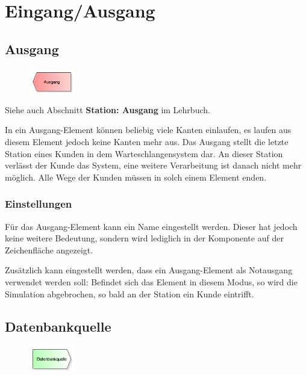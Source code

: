 \chapter{Eingang/Ausgang}

\renewcommand{\thepage}{\arabic{page}}
\setcounter{page}{1}

\section{Ausgang}
\label{ref:ModelElementDispose}

\begin{figure}
\vspace{-22pt}
\includegraphics[width=2cm]{imageModelElementDispose.png}
\vspace{-22pt}
\end{figure}

Siehe auch Abschnitt \textbf{Station: Ausgang} im Lehrbuch.

In ein Ausgang-Element können beliebig viele Kanten einlaufen, es laufen aus diesem Element jedoch keine Kanten mehr aus.
Das Ausgang stellt die letzte Station eines Kunden in dem Warteschlangensystem dar. An dieser Station verlässt der Kunde
das System, eine weitere Verarbeitung ist danach nicht mehr möglich. Alle Wege der Kunden müssen in solch einem Element enden.

\subsection*{Einstellungen}

Für das Ausgang-Element kann ein Name eingestellt werden. Dieser hat jedoch keine weitere Bedeutung, sondern wird lediglich
in der Komponente auf der Zeichenfläche angezeigt.

Zusätzlich kann eingestellt werden, dass ein Ausgang-Element als Notausgang verwendet werden soll: Befindet sich das Element
in diesem Modus, so wird die Simulation abgebrochen, so bald an der Station ein Kunde eintrifft.


\section{Datenbankquelle}
\label{ref:ModelElementSourceDB}

\begin{figure}
\vspace{-22pt}
\includegraphics[width=2cm]{imageModelElementSourceDB.png}
\vspace{-22pt}
\end{figure}

